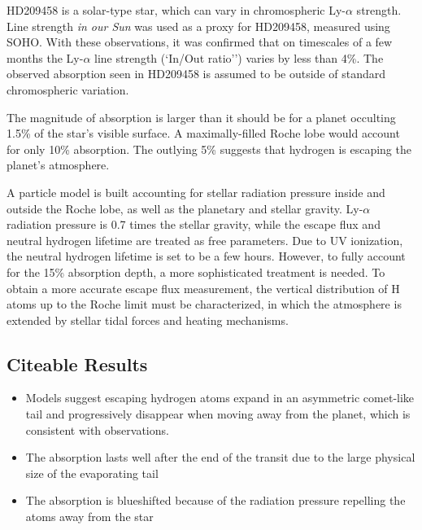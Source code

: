 \documentclass[onecolumn]{aastex63}
\begin{document}
HD209458 is a solar-type star, which can vary in chromospheric Ly-$\alpha$ strength. Line strength \textit{in our Sun} was used as a proxy for HD209458, measured using SOHO. With these observations, it was confirmed that on timescales of a few months the Ly-$\alpha$ line strength (`In/Out ratio'') varies by less than 4\%. The observed absorption seen in HD209458 is assumed to be outside of standard chromospheric variation.

The magnitude of absorption is larger than it should be for a planet occulting 1.5\% of the star's visible surface. A maximally-filled Roche lobe would account for only 10\% absorption. The outlying 5\% suggests that hydrogen is escaping the planet's atmosphere. 

A particle model is built accounting for stellar radiation pressure inside and outside the Roche lobe, as well as the planetary and stellar gravity. Ly-$\alpha$ radiation pressure is 0.7 times the stellar gravity, while the escape flux and neutral hydrogen lifetime are treated as free parameters. Due to UV ionization, the neutral hydrogen lifetime is set to be a few hours. 
However, to fully account for the 15\% absorption depth, a more sophisticated treatment is needed. To obtain a more accurate escape flux measurement, the vertical distribution of H atoms up to the Roche limit must be characterized, in which the atmosphere is extended by stellar tidal forces and heating mechanisms. 

\subsection{Citeable Results}
\begin{itemize}
    \item Models suggest escaping hydrogen atoms expand in an asymmetric comet-like tail and progressively disappear when moving away from the planet, which is consistent with observations.
    \item The absorption lasts well after the end of the transit due to the large physical size of the evaporating tail
    \item The absorption is blueshifted because of the radiation pressure repelling the atoms away from the star
\end{itemize}

\end{document}
